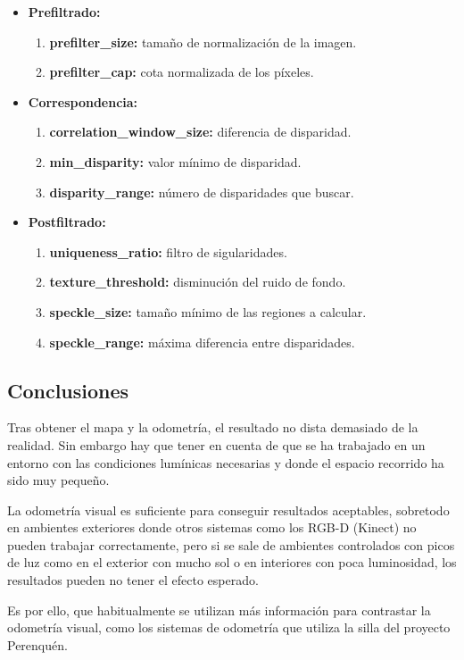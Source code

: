 \begin{itemize}
  \item \textbf{Prefiltrado:}
  \begin{enumerate}
    \item \textbf{prefilter\_size:} tamaño de normalización de la imagen.
    \item \textbf{prefilter\_cap:} cota normalizada de los píxeles.
  \end{enumerate}
  \item \textbf{Correspondencia:}
  \begin{enumerate}
    \item \textbf{correlation\_window\_size:} diferencia de disparidad. 
    \item \textbf{min\_disparity:} valor mínimo de disparidad.
    \item \textbf{disparity\_range:} número de disparidades que buscar.
  \end{enumerate}
  \item \textbf{Postfiltrado:}
  \begin{enumerate}
    \item \textbf{uniqueness\_ratio:} filtro de sigularidades.
    \item \textbf{texture\_threshold:} disminución del ruido de fondo.
    \item \textbf{speckle\_size:} tamaño mínimo de las regiones a calcular.
    \item \textbf{speckle\_range:} máxima diferencia entre disparidades.
  \end{enumerate}
\end{itemize}

\subsection{Conclusiones}
Tras obtener el mapa y la odometría, el resultado no dista demasiado de la
realidad. Sin embargo hay que tener en cuenta de que se ha trabajado en un
entorno con las condiciones lumínicas necesarias y donde el espacio recorrido ha
sido muy pequeño.

La odometría visual es suficiente para conseguir resultados aceptables,
sobretodo en ambientes exteriores donde otros sistemas como los RGB-D (Kinect)
no pueden trabajar correctamente, pero si se sale de ambientes controlados con
picos de luz como en el exterior con mucho sol o en interiores con poca
luminosidad, los resultados pueden no tener el efecto esperado.

Es por ello, que habitualmente se utilizan más información para contrastar la
odometría visual, como los sistemas de odometría que utiliza la silla del
proyecto Perenquén.

